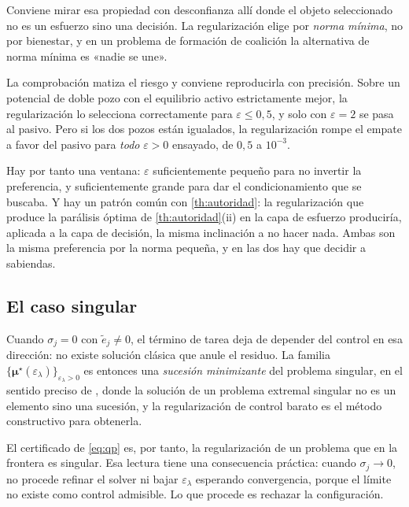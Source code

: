 \begin{observacion}
\label{obs:tikhonov-sesgo}
Conviene mirar esa propiedad con desconfianza allí donde el objeto seleccionado
no es un esfuerzo sino una decisión. La regularización elige por \emph{norma
mínima}, no por bienestar, y en un problema de formación de coalición la
alternativa de norma mínima es «nadie se une».

La comprobación matiza el riesgo y conviene reproducirla con precisión. Sobre un
potencial de doble pozo con el equilibrio activo estrictamente mejor, la
regularización lo selecciona correctamente para $\varepsilon\le0{,}5$, y solo con
$\varepsilon=2$ se pasa al pasivo. Pero si los dos pozos están igualados, la
regularización rompe el empate a favor del pasivo para \emph{todo}
$\varepsilon>0$ ensayado, de $0{,}5$ a $10^{-3}$.

Hay por tanto una ventana: $\varepsilon$ suficientemente pequeño para no invertir
la preferencia, y suficientemente grande para dar el condicionamiento que se
buscaba. Y hay un patrón común con \cref{th:autoridad}: la
regularización que produce la parálisis óptima de \cref{th:autoridad}(ii) en la
capa de esfuerzo produciría, aplicada a la capa de decisión, la misma inclinación
a no hacer nada. Ambas son la misma preferencia por la norma pequeña, y en las
dos hay que decidir a sabiendas.
\end{observacion}

\subsection{El caso singular}

Cuando $\sigma_j=0$ con $\tilde e_j\neq0$, el término de tarea deja de depender
del control en esa dirección: no existe solución clásica que anule el residuo.
La familia $\{\bm\mu^{\star}(\varepsilon_\lambda)\}_{\varepsilon_\lambda>0}$ es
entonces una \emph{sucesión minimizante} del problema singular, en el sentido
preciso de \cite{glizer2022singular}, donde la solución de un problema
extremal singular no es un elemento sino una sucesión, y la regularización de
control barato es el método constructivo para obtenerla.

El certificado de \eqref{eq:qp} es, por tanto, la regularización de un problema
que en la frontera es singular. Esa lectura tiene una consecuencia práctica:
cuando $\sigma_j\to0$, no procede refinar el solver ni bajar $\varepsilon_\lambda$
esperando convergencia, porque el límite no existe como control admisible. Lo
que procede es rechazar la configuración.

